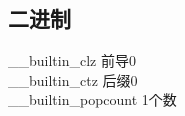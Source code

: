 ﻿\subsection{二进制}
    \_\_builtin\_clz  前导0 \\
    \_\_builtin\_ctz 后缀0 \\
    \_\_builtin\_popcount 1个数 \\
